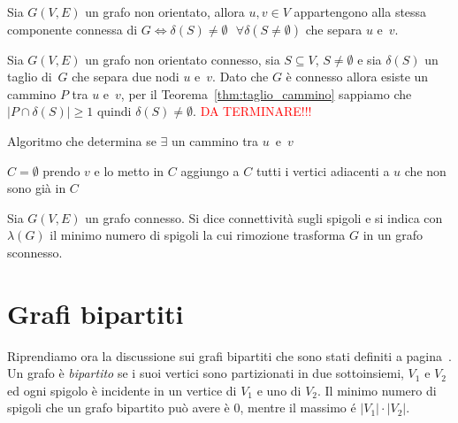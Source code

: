 \begin{thm}
Sia $G(V,E)$ un grafo non orientato, allora ${u,v \in V}$ appartengono alla stessa 
componente connessa di ${G \iff \delta(S) \neq \emptyset \text{ } \forall 
\delta(S\neq \emptyset)}$ che separa $u$ e~$v$.
\end{thm}
\proof
Sia ${G(V,E)}$ un grafo non orientato connesso, sia ${S \subseteq V}$, ${S \neq \emptyset}$ e
sia $\delta(S)$ un taglio di~$G$ che separa due nodi $u$ e~$v$. Dato che $G$ è connesso allora
esiste un cammino $P$ tra $u$ e~$v$, per il Teorema~\ref{thm:taglio_cammino} sappiamo che
${ |P \cap \delta(S)| \geqslant 1 }$ quindi ${\delta(S) \neq \emptyset}$.
\textcolor{red}{DA TERMINARE!!!}
\endproof

\begin{algorithm}
\caption{Algoritmo che determina se $\exists$ un cammino tra $u$~e~$v$ }\label{alg:algo_bipartizione}
\begin{algorithmic}
\STATE $C = \emptyset$
\STATE prendo $v$ e lo metto in $C$ 
\STATE {}
    \STATE aggiungo a $C$ tutti i vertici adiacenti a $u$ che non sono già in $C$
\ENDFOR
\STATE {}

\end{algorithmic}
\end{algorithm}

\begin{defn}
Sia ${G(V,E)}$ un grafo connesso. Si dice connettività
sugli spigoli e si indica con~$\lambda(G)$ il minimo numero di spigoli la cui rimozione 
trasforma $G$ in un grafo sconnesso.
\end{defn}


\section{Grafi bipartiti}
Riprendiamo ora la discussione sui grafi bipartiti che sono stati definiti a pagina~\pageref{bip}.
Un grafo è \emph{bipartito} se i suoi vertici sono partizionati in due sottoinsiemi,
$V_1$ e $V_2$ ed ogni spigolo è incidente in un vertice di $V_1$ e uno di $V_2$.
Il minimo numero di spigoli che un grafo bipartito può avere è $0$, mentre il massimo é 
$|V_1|\cdot|V_2|$.

